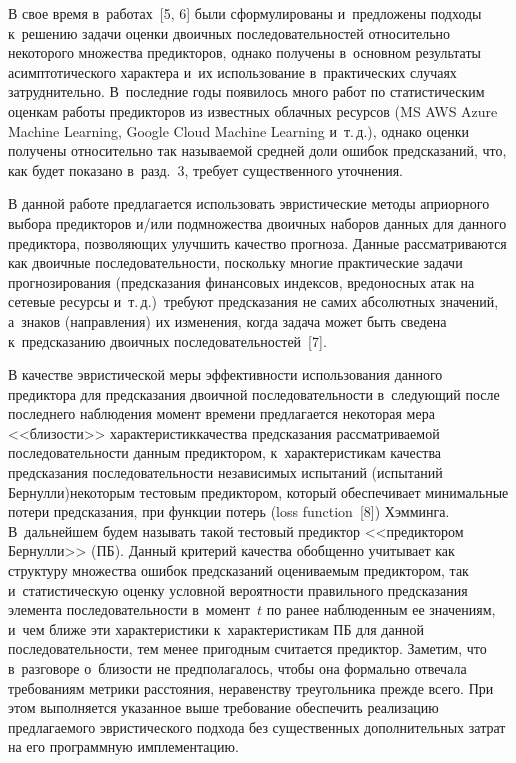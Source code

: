\begin{multicols}{2}
   В свое время в~работах~[5, 6] были сформулированы и~предложены 
подходы к~решению задачи оценки двоичных последовательностей 
относительно некоторого множества предикторов, однако получены 
в~основном результаты асимптотического характера и~их использование 
в~практических случаях затруднительно. В~последние годы появилось много 
работ по статистическим оценкам работы предикторов из известных 
облачных ресурсов (MS AWS Azure Machine Learning, Google Cloud Machine 
Learning и~т.\,д.), однако оценки получены относительно так называемой 
средней доли ошибок предсказаний, что, как будет показано в~разд.~3, 
требует существенного уточнения. 
  
  В данной работе предлагается использовать эвристические методы 
априорного выбора пре\-дик\-то\-ров и/или подмножества двоичных наборов 
данных для данного предиктора, позволяющих улучшить качество прогноза. 
Данные рассматриваются как двоичные последовательности, поскольку 
многие практические задачи прогнозирования (предсказания финансовых 
индексов, вредоносных атак на сетевые ресурсы и~т.\,д.)\ требуют 
предсказания не самих абсолютных значений, а~знаков (на\-прав\-ле\-ния) их 
изменения, когда задача может быть сведена к~предсказанию двоичных 
последовательностей~[7].
{

}
   
  В качестве эвристической меры эффективности использования данного 
предиктора для предсказания двоичной последовательности в~следующий 
после последнего наблюдения момент времени предлагается некоторая мера 
<<близости>> характеристик\linebreak качества предсказания рассматриваемой 
последовательности данным предиктором, к~характеристикам качества 
предсказания последовательности независимых испытаний (испытаний 
Бернулли)\linebreak некоторым тестовым предиктором, который обеспечивает 
минимальные потери предсказания, при функции потерь (loss function~[8]) 
Хэмминга. В~дальнейшем будем называть такой тестовый предиктор 
<<предиктором Бернулли>> (ПБ). Данный критерий качества обобщенно 
учитывает как структуру множества ошибок предсказаний оцениваемым 
предиктором, так и~статистическую оценку условной вероятности 
правильного предсказания элемента последовательности в~момент~$t$ по 
ранее наблюденным ее значениям, и~чем ближе эти характеристики 
к~характеристикам ПБ для данной последовательности, тем менее 
пригодным считается предиктор. Заметим, что в~разговоре о~бли\-зости не 
предполагалось, чтобы она формально отвечала требованиям метрики 
расстояния, неравенству треугольника прежде всего. При этом выполняется 
указанное выше требование обеспечить реализацию предлагаемого 
эвристического подхода без существенных дополнительных затрат на его 
программную имплементацию.


\end{multicols}
